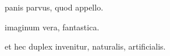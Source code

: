 \documentclass{article}
\begin{document}
\begin{ledgroup}
\beginnumbering
\pstart
panis parvus, quod  appello. 
\pend

\pstart
imaginum  vera,  fantastica.
\pend

\pstart
et hec duplex invenitur,  naturalis,  artificialis.
\pend
\endnumbering
\end{ledgroup}
\end{document}
